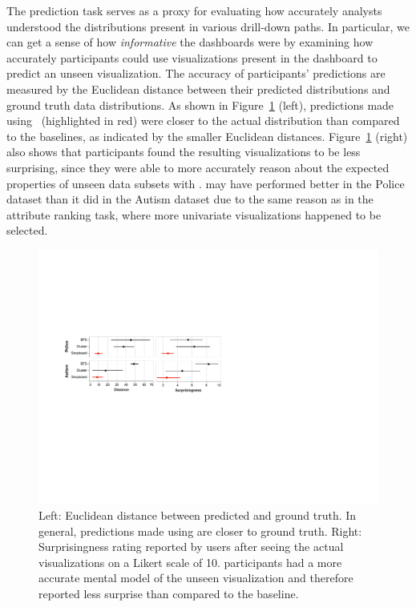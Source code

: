  The prediction task serves as a proxy for evaluating how accurately analysts understood the distributions present in various drill-down paths. In particular, we can get a sense of how \emph{informative} the dashboards were by examining how accurately participants could use visualizations present in the dashboard to predict an unseen visualization. The accuracy of participants' predictions are measured by the Euclidean distance between their predicted distributions and ground truth data distributions. As shown in Figure~\ref{fig:distance} (left), predictions made using \system\ (highlighted in red) were closer to the actual distribution than compared to the baselines, as indicated by the smaller Euclidean distances. Figure~\ref{fig:distance} (right) also shows that \system participants found the resulting visualizations to be less surprising, since they were able to more accurately reason about the expected properties of unseen data subsets with \system. \cluster may have performed better in the Police dataset than it did in the Autism dataset due to the same reason as in the attribute ranking task, where more univariate visualizations happened to be selected.
\begin{figure}[h!]
\centering
\includegraphics[width=\linewidth]{figures/prediction_surprisingness_distance.pdf}
\caption{Left: Euclidean distance between predicted and ground truth. In general, predictions made using \system are closer to ground truth. Right: Surprisingness rating reported by users after seeing the actual visualizations on a Likert scale of 10. \system participants had a more accurate mental model of the unseen visualization and therefore reported less surprise than compared to the baseline.}
\label{fig:distance}
\end{figure}
